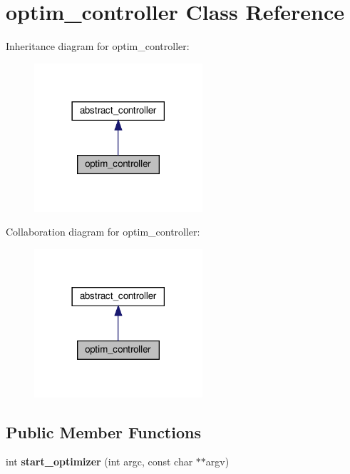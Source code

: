 \hypertarget{classoptim__controller}{}\section{optim\+\_\+controller Class Reference}
\label{classoptim__controller}


Inheritance diagram for optim\+\_\+controller\+:\nopagebreak
\begin{figure}[H]
\begin{center}
\leavevmode
\includegraphics[width=177pt]{classoptim__controller__inherit__graph}
\end{center}
\end{figure}


Collaboration diagram for optim\+\_\+controller\+:\nopagebreak
\begin{figure}[H]
\begin{center}
\leavevmode
\includegraphics[width=177pt]{classoptim__controller__coll__graph}
\end{center}
\end{figure}
\subsection*{Public Member Functions}
\begin{DoxyCompactItemize}
\item 
\mbox{\label{classoptim__controller_a239f21ed616ef8f350b386cea9be81c1}} 
int {\bfseries start\+\_\+optimizer} (int argc, const char $\ast$$\ast$argv)
\end{DoxyCompactItemize}
